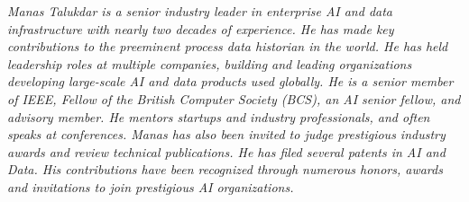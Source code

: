 {\selectfont
	\begin{justify}\textit{Manas Talukdar is a senior industry leader in enterprise AI and data infrastructure with nearly two decades of experience. He has made key contributions to the preeminent process data historian in the world. He has held leadership roles at multiple companies, building and leading organizations developing large-scale AI and data products used globally. He is a senior member of IEEE, Fellow of the British Computer Society (BCS), an AI senior fellow, and advisory member. He mentors startups and industry professionals, and often speaks at conferences. Manas has also been invited to judge prestigious industry awards and review technical publications. He has filed several patents in AI and Data. His contributions have been recognized through numerous honors, awards and invitations to join prestigious AI organizations.}\end{justify}
}
\vspace{-12pt}
